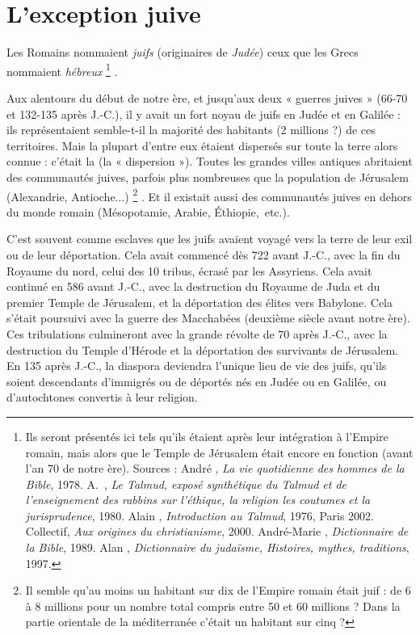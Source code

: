 

\chapter{L'exception juive}

 Les Romains nommaient \emph{juifs} (originaires de \emph{Judée}) ceux que les Grecs nommaient \emph{hébreux}%
\footnote{Ils seront présentés ici tels qu'ils étaient après leur intégration à l'Empire romain, mais alors que le Temple de Jérusalem était encore en fonction (avant l'an 70 de notre ère).
Sources : André , \emph{La vie quotidienne des hommes de la Bible}, 1978. A.~, \emph{Le Talmud, exposé synthétique du Talmud et de l'enseignement des rabbins sur l'éthique, la religion les coutumes et la jurisprudence}, 1980. Alain , \emph{Introduction au Talmud}, 1976, Paris 2002. Collectif, \emph{Aux origines du christianisme}, 2000. André-Marie , \emph{Dictionnaire de la Bible}, 1989. Alan , \emph{Dictionnaire du judaïsme, Histoires, mythes, traditions}, 1997.}%
.

 Aux alentours du début de notre ère, et jusqu'aux deux « guerres juives » (\hbox{66-70} et \hbox{132-135} après J.-C.), il y avait un fort noyau de juifs en Judée et en Galilée : ils représentaient semble-t-il la majorité des habitants (2 millions ?) de ces territoires. Mais la plupart d'entre eux étaient dispersés sur toute la terre alors connue : c'était la  (la « dispersion »). Toutes les grandes villes antiques abritaient des communautés juives, parfois plus nombreuses que la population de Jérusalem (Alexandrie, Antioche...)%
\footnote{Il semble qu'au moins un habitant sur dix de l'Empire romain était juif : de 6 à 8 millions pour un nombre total compris entre 50 et 60 millions ? Dans la partie orientale de la méditerranée c'était un habitant sur cinq ?}%
. Et il existait aussi des communautés juives en dehors du monde romain (Mésopotamie, Arabie, Éthiopie,~etc.).

 C'est souvent comme esclaves que les juifs avaient voyagé vers la terre de leur exil ou de leur déportation. Cela avait commencé dès 722 avant J.-C., avec la fin du Royaume du nord, celui des 10 tribus, écrasé par les Assyriens. Cela avait continué en 586 avant J.-C., avec la destruction du Royaume de Juda et du premier Temple de Jérusalem, et la déportation des élites vers Babylone. Cela s'était poursuivi avec la guerre des Macchabées (deuxième siècle avant notre ère). Ces tribulations culmineront avec la grande révolte de 70 après J.-C., avec la destruction du Temple d'Hérode et la déportation des survivants de Jérusalem. En 135 après J.-C., la diaspora deviendra l'unique lieu de vie des juifs, qu'ils soient descendants d'immigrés ou de déportés nés en Judée ou en Galilée, ou d'autochtones convertis à leur religion. 

